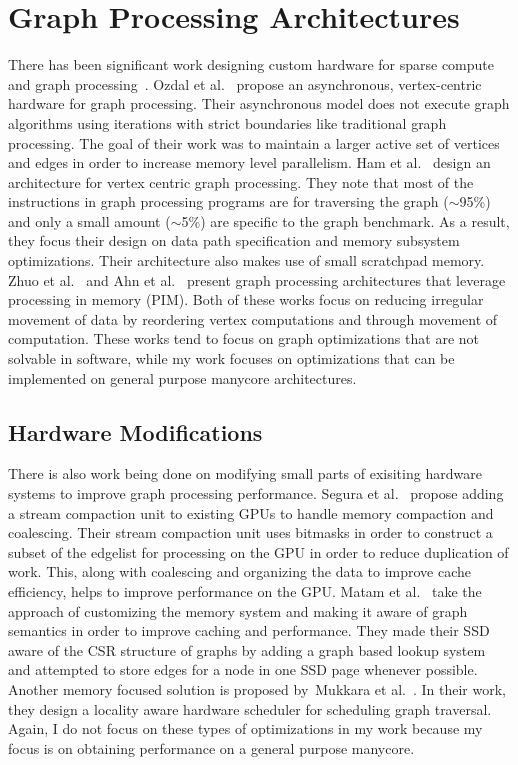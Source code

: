 \section{Graph Processing Architectures} There has been significant work designing custom hardware for sparse compute and graph processing~\cite{ham2016graphicionado, jeffrey2015scalable, li2018graphia, dai2018graphh, addisie2018heterogeneous, yao2018efficient, ahn2016scalable}.
Ozdal et al.~\cite{ozdal2016energy} propose an asynchronous, vertex-centric hardware for graph processing. 
Their asynchronous model does not execute graph algorithms using iterations with strict boundaries like traditional graph processing. 
The goal of their work was to maintain a larger active set of vertices and edges in order to increase memory level parallelism. 
Ham et al.~\cite{ham2016graphicionado} design an architecture for vertex centric graph processing. 
They note that most of the instructions in graph processing programs are for traversing the graph ($\sim$95\%) and only a small amount ($\sim$5\%) are specific to the graph benchmark. 
As a result, they focus their design on data path specification and memory subsystem optimizations.
Their architecture also makes use of small scratchpad memory.
Zhuo et al.~\cite{zhuo2019graphq} and Ahn et al.~\cite{ahn2016scalable} present graph processing architectures that leverage processing in memory (PIM).
Both of these works focus on reducing irregular movement of data by reordering vertex computations and through movement of computation.
These works tend to focus on graph optimizations that are not solvable in software, while my work focuses on optimizations that can be implemented on general purpose manycore architectures.

\subsection{Hardware Modifications} There is also work being done on modifying small parts of exisiting hardware systems to improve graph processing performance. 
Segura et al.~\cite{segura2019scu} propose adding a stream compaction unit to existing GPUs to handle memory compaction and coalescing.
Their stream compaction unit uses bitmasks in order to construct a subset of the edgelist for processing on the GPU in order to reduce duplication of work. 
This, along with coalescing and organizing the data to improve cache efficiency, helps to improve performance on the GPU.
Matam et al.~\cite{matam2019graphssd} take the approach of customizing the memory system and making it aware of graph semantics in order to improve caching and performance. 
They made their SSD aware of the CSR structure of graphs by adding a graph based lookup system and attempted to store edges for a node in one SSD page whenever possible.
Another memory focused solution is proposed by~Mukkara et al.~\cite{mukkara2018exploiting}.
In their work, they design a locality aware hardware scheduler for scheduling graph traversal.
Again, I do not focus on these types of optimizations in my work because my focus is on obtaining performance on a general purpose manycore.

